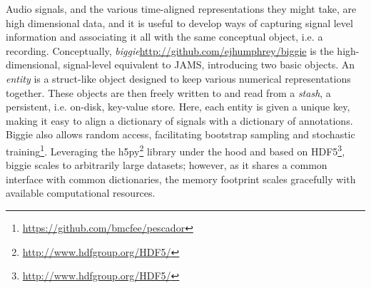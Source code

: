 Audio signals, and the various time-aligned representations they might take, are high dimensional data, and it is useful to develop ways of capturing signal level information and associating it all with the same conceptual object, i.e. a recording.
Conceptually, \emph{biggie}\url{http://github.com/ejhumphrey/biggie} is the high-dimensional, signal-level equivalent to JAMS, introducing two basic objects.
An \emph{entity} is a struct-like object designed to keep various numerical representations together.
These objects are then freely written to and read from a \emph{stash}, a persistent, i.e. on-disk, key-value store.
Here, each entity is given a unique key, making it easy to align a dictionary of signals with a dictionary of annotations.
Biggie also allows random access, facilitating bootstrap sampling and stochastic training\footnote{\url{https://github.com/bmcfee/pescador}}.
Leveraging the h5py\footnote{\url{http://www.hdfgroup.org/HDF5/}} library under the hood and based on HDF5\footnote{\url{http://www.hdfgroup.org/HDF5/}}, biggie scales to arbitrarily large datasets;
however, as it shares a common interface with common dictionaries, the memory footprint scales gracefully with available computational resources.








